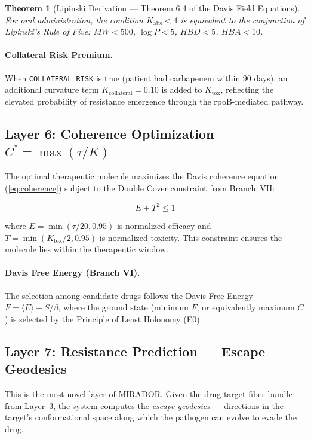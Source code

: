 \documentclass[11pt]{article}
\newtheorem{theorem}{Theorem}
\begin{document}
\begin{theorem}[Lipinski Derivation — Theorem 6.4 of the Davis Field Equations]
For oral administration, the condition $K_{\text{abs}} < 4$ is equivalent to the conjunction
of Lipinski's Rule of Five: $MW < 500$, $\log P < 5$, $HBD < 5$, $HBA < 10$.
\end{theorem}

\paragraph{Collateral Risk Premium.}
When \texttt{COLLATERAL\_RISK} is true (patient had carbapenem within 90 days), an additional
curvature term $K_{\text{collateral}} = 0.10$ is added to $K_{\text{tox}}$, reflecting the
elevated probability of resistance emergence through the rpoB-mediated pathway.

\subsection{Layer 6: Coherence Optimization $C^* = \max(\tau/K)$}

The optimal therapeutic molecule maximizes the Davis coherence equation (\ref{eq:coherence})
subject to the Double Cover constraint from Branch~VII:

\begin{equation}\label{eq:double_cover}
E + T^2 \leq 1
\end{equation}

\noindent where $E = \min(\tau/20, 0.95)$ is normalized efficacy and $T = \min(K_{\text{tox}}/2, 0.95)$
is normalized toxicity. This constraint ensures the molecule lies within the therapeutic
window.

\paragraph{Davis Free Energy (Branch VI).}
The selection among candidate drugs follows the Davis Free Energy $F = \langle E \rangle -
S/\beta$, where the ground state (minimum $F$, or equivalently maximum $C$) is selected by
the Principle of Least Holonomy (E0).

\subsection{Layer 7: Resistance Prediction — Escape Geodesics}

This is the most novel layer of MIRADOR. Given the drug-target fiber bundle from Layer~3,
the system computes the \emph{escape geodesics} — directions in the target's conformational
space along which the pathogen can evolve to evade the drug.
\end{document}

